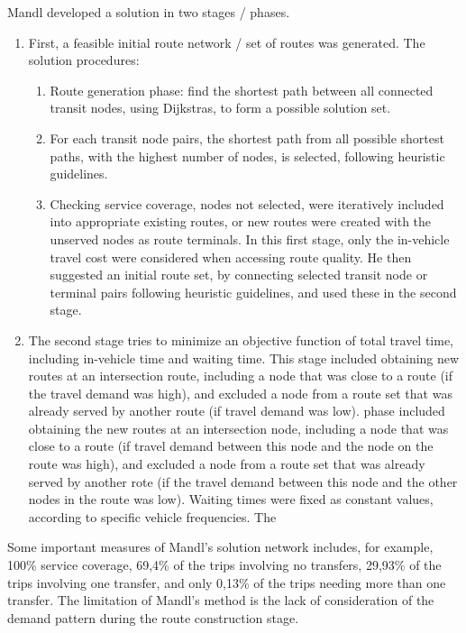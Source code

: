 Mandl developed a solution in two stages / phases. 
\begin{enumerate}
\item First, a feasible initial route network / set of routes was generated. The solution procedures:
\begin{enumerate}
 \item Route generation phase: find the shortest path between all connected transit nodes, using Dijkstras, to form a possible solution set. 
 \item For each transit node pairs, the shortest path from all possible shortest paths, with the highest number of nodes, is selected, following heuristic guidelines. 

 \item Checking service coverage, nodes not selected, were iteratively included into appropriate existing routes, or new routes were created with the unserved nodes as route terminals. 
In this first stage, only the in-vehicle travel cost were considered when accessing route quality. He then suggested an initial route set, by connecting selected transit node or terminal pairs following heuristic guidelines, and used these in the second stage. 
 \end{enumerate}
\item The second stage tries to minimize an objective function of total travel time, including in-vehicle time and waiting time. This stage included obtaining new routes at an intersection route, including a node that was close to a route (if the travel demand was high), and excluded a node from a route set that was already served by another route (if travel demand was low). phase included obtaining the new routes at an intersection node, including a node that was close to a route (if travel demand between this node and the node on the route was high), and excluded a node from a route set that was already served by another rote (if the travel demand between this node and the other nodes in the route was low). Waiting times were fixed as constant values, according to specific vehicle frequencies.  The 
\end{enumerate}

Some important measures of Mandl's solution network includes, for example, 100\% service coverage, 69,4\% of the trips involving no transfers, 29,93\% of the trips involving one transfer, and only 0,13\% of the trips needing more than one transfer. The limitation of Mandl's method is the lack of consideration of the demand pattern during the route construction stage.\citep{zhao03}


